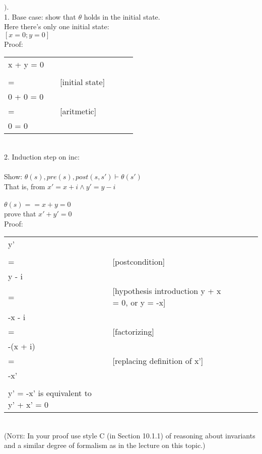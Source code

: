 \documentclass{article}
\begin{document}
$)$.
\\
1. Base case: show that $\theta$ holds in the initial state. \\
Here there's only one initial state: \\
$[x = 0;y = 0 ]$ \\ 
Proof: \\
\begin{tabular}{l ll lll}
     x + y = 0 \\ &    &  \\
     = &   & [initial state] \\
     0 + 0 = 0 & & \\
     = &   & [aritmetic] \\
     0 = 0  \\
\end{tabular} \\
2. Induction step on inc: \\
\\
Show: $\theta (s), pre(s), post(s, s') \vdash \theta(s')$ \\
That is, from $x' = x + i \wedge y' = y - i$ \\
\\
$ \theta (s) == x + y = 0 $ \\
prove that $ x' + y' = 0 $ \\
Proof: \\
\begin{tabular}{l ll lll}
     y' \\ &    &  \\
     = &   & [postcondition] \\
     y - i & & \\
     = &   &  [hypothesis introduction  y + x = 0, or y = -x] \\
     -x - i \\
     = & & [factorizing] \\ 
     -(x + i) \\
     = & & [replacing definition of x'] \\
     -x' \\
     \\
    y' = -x' is equivalent to y' + x' = 0 \\
\end{tabular} \\
\noindent (\textsc{Note:} In your proof use style C (in Section 10.1.1) of reasoning about invariants and a similar degree of formalism as in the lecture on this topic.)

\vspace{12pt}
\end{document}
